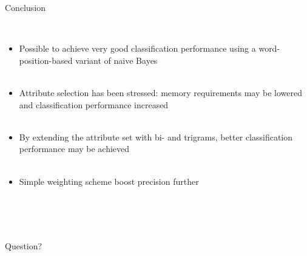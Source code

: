 \documentclass[]{beamer}
\begin{document}
\begin{frame}[t]{\centerline{Conclusion}}
  \ \\
  \begin{itemize}
  \fontsize{13}{11}\selectfont
  \item Possible to achieve very good classification performance using a word-position-based variant of naive Bayes
  \ \\
  \ \\
  \item Attribute selection has been stressed: memory requirements may be lowered and classification performance increased
  \ \\
  \ \\
  \item By extending the attribute set with bi- and trigrams, better classification performance may be achieved
  \ \\
  \ \\
  \item Simple weighting scheme boost precision further
  \end{itemize}
\end{frame}
\note{}

\begin{frame}[t]{\centerline{}}
  \ \\
  \begin{center}
  \begin{Huge}
  \ \\
  \ \\
  Question?
  \end{Huge}
  \end{center}
\end{frame}
\end{document}
